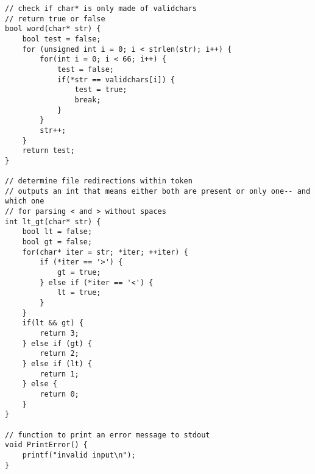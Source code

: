 \documentclass[12pt,letter,titlepage]{article}
\begin{document}
{{{{{\begin{verbatim}
// check if char* is only made of validchars
// return true or false
bool word(char* str) {
	bool test = false;
	for (unsigned int i = 0; i < strlen(str); i++) {
		for(int i = 0; i < 66; i++) {
			test = false;
			if(*str == validchars[i]) {
				test = true;
				break;
			}
		}
		str++;
	}
	return test;
}

// determine file redirections within token
// outputs an int that means either both are present or only one-- and which one
// for parsing < and > without spaces
int lt_gt(char* str) {
	bool lt = false;
	bool gt = false;
	for(char* iter = str; *iter; ++iter) {
		if (*iter == '>') {
			gt = true;
		} else if (*iter == '<') {
			lt = true;
		}
	}
	if(lt && gt) {
		return 3;
	} else if (gt) {
		return 2;
	} else if (lt) {
		return 1;
	} else {
		return 0;
	}
}

// function to print an error message to stdout
void PrintError() {
	printf("invalid input\n");
}


\end{verbatim}}}}}}
\end{document}
